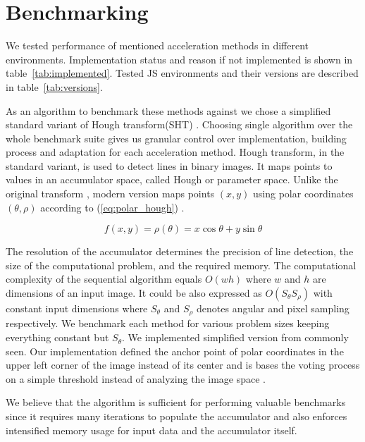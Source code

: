 \section{Benchmarking}\label{sec:benchmarking}

We tested performance of mentioned acceleration methods in different environments. Implementation status and reason if not implemented is shown in table~\ref{tab:implemented}. Tested JS environments and their versions are described in table~\ref{tab:versions}.



As an algorithm to benchmark these methods against we chose a simplified standard variant of Hough transform(SHT) \cite{mukhopadhyay2015survey}. Choosing single algorithm over the whole benchmark suite gives us granular control over implementation, building process and adaptation for each acceleration method. Hough transform, in the standard variant, is used to detect lines in binary images. It maps points to values in an accumulator space, called Hough or parameter space. Unlike the original transform \cite{hough1962method}, modern version maps points $(x, y)$ using polar coordinates $(\theta, \rho)$ according to (\ref{eq:polar_hough}) \cite{duda1972use}.

\begin{equation}
    \label{eq:polar_hough}
    f(x,y) = \rho(\theta) = x\cos{\theta}+y\sin{\theta}
\end{equation}



The resolution of the accumulator determines the precision of line detection, the size of the computational problem, and the required memory. The computational complexity of the sequential algorithm equals $O(wh)$ where $w$ and $h$ are dimensions of an input image. It could be also expressed as $O(S_{\theta} S_\rho)$ with constant input dimensions where $S_{\theta}$ and $S_\rho$ denotes angular and pixel sampling respectively. We benchmark each method for various problem sizes keeping everything constant but $S_\theta$. We implemented simplified version from commonly seen. Our implementation defined the anchor point of polar coordinates in the upper left corner of the image instead of its center and is bases the voting process on a simple threshold instead of analyzing the image space \cite{palmer1997optimizing}.

We believe that the algorithm is sufficient for performing valuable benchmarks since it requires many iterations to populate the accumulator and also enforces intensified memory usage for input data and the accumulator itself. 

